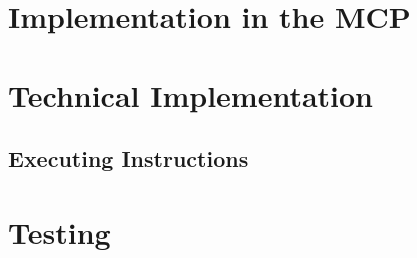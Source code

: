 \section{Implementation in the MCP}




\section{Technical Implementation}
\subsection{Executing Instructions}

\section{Testing}


